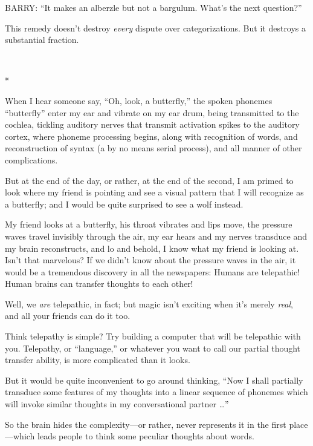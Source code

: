 {
 BARRY: ``It makes an alberzle but not a bargulum.
What's the next question?''}

{
 This remedy doesn't destroy \textit{every} dispute
over categorizations. But it destroys a substantial fraction.}

{\centering
 \ ~
\par}

{\centering
 *
\par}


{
 When I hear someone say, ``Oh, look, a
butterfly,'' the spoken phonemes
``butterfly'' enter my ear and
vibrate on my ear drum, being transmitted to the cochlea, tickling
auditory nerves that transmit activation spikes to the auditory cortex,
where phoneme processing begins, along with recognition of words, and
reconstruction of syntax (a by no means serial process), and all manner
of other complications. }

{
 But at the end of the day, or rather, at the end of the second, I
am primed to look where my friend is pointing and see a visual pattern
that I will recognize as a butterfly; and I would be quite surprised to
see a wolf instead.}

{
 My friend looks at a butterfly, his throat vibrates and lips move,
the pressure waves travel invisibly through the air, my ear hears and
my nerves transduce and my brain reconstructs, and lo and behold, I
know what my friend is looking at. Isn't that
marvelous? If we didn't know about the pressure waves
in the air, it would be a tremendous discovery in all the newspapers:
Humans are telepathic! Human brains can transfer thoughts to each
other!}

{
 Well, we \textit{are} telepathic, in fact; but magic
isn't exciting when it's merely
\textit{real}, and all your friends can do it too.}

{
 Think telepathy is simple? Try building a computer that will be
telepathic with you. Telepathy, or
``language,'' or whatever you want
to call our partial thought transfer ability, is more complicated than
it looks.}

{
 But it would be quite inconvenient to go around thinking,
``Now I shall partially transduce some features of my
thoughts into a linear sequence of phonemes which will invoke similar
thoughts in my conversational partner \ldots''}

{
 So the brain hides the complexity---or rather, never represents it
in the first place---which leads people to think some peculiar thoughts
about words.}


